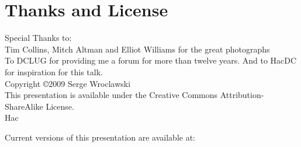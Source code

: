 \documentclass[notes]{beamer}
\begin{document}
\section{Thanks and License}

\begin{frame}
  \vfill
  Special Thanks to:\\
  Tim Collins, Mitch Altman and Elliot Williams for the great photographs
  \\
  To DCLUG for providing me a forum for more than twelve years.
  And to HacDC for inspiration for this talk.
  \\
  Copyright \copyright 2009 Serge Wroclawski
  \\
  This presentation is available under the Creative Commons
  Attribution-ShareAlike License.
  \\
  Hac
  
  Current versions of this presentation are available at:
\end{frame}
\end{document}
